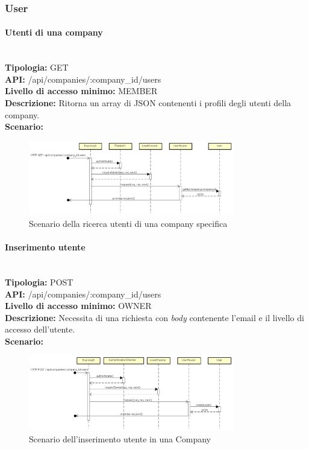 \newpage
\subsubsection{User}
\paragraph{Utenti di una company}\mbox{}\\
\textbf{Tipologia:} GET \\
\textbf{API:} /api/companies/:company\_id/users \\
\textbf{Livello di accesso minimo:} MEMBER \\
\textbf{Descrizione:} Ritorna un array di JSON contenenti i profili degli utenti della company. \\
\textbf{Scenario:} 
\begin{figure}[H]
\centering
\includegraphics[width=0.8\textwidth]{res/sections/backend/sequence/(GET)user.png}
\caption{Scenario della ricerca utenti di una company specifica}
\end{figure}

\newpage
\paragraph{Inserimento utente}\mbox{}\\
\textbf{Tipologia:} POST \\
\textbf{API:} /api/companies/:company\_id/users \\
\textbf{Livello di accesso minimo:} OWNER \\
\textbf{Descrizione:} Necessita di una richiesta con \textit{body} contenente l'email e il livello di accesso dell'utente.\\
\textbf{Scenario:} 
\begin{figure}[H]
\centering
\includegraphics[width=0.8\textwidth]{res/sections/backend/sequence/(POST)user.png}
\caption{Scenario dell'inserimento utente in una Company}
\end{figure}

